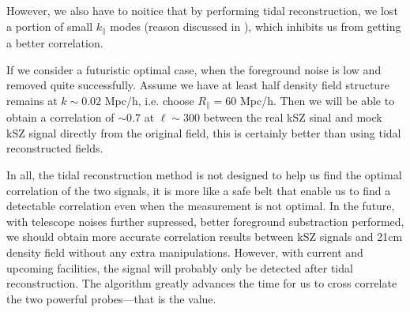 However, we also have to noitice that by performing tidal reconstruction, 
we lost a portion of small $k_\parallel$ modes (reason discussed in \cite{2015:zhu}), 
which inhibits us from getting a better correlation.

If we consider a futuristic optimal case, when the foreground noise is
low and removed quite successfully.
Assume we have at least half density field structure remains at $k\sim
0.02$ Mpc/h, i.e. choose $R_\parallel=60$ Mpc/h.
Then we will be able to obtain a correlation of $\sim0.7$ at
$\ell\sim 300$ between the real kSZ sinal and mock kSZ signal directly
from the original field, this is certainly better than using tidal
reconstructed fields.

In all, the tidal reconstruction method is not designed to help us find the optimal correlation of the two signals, 
it is more like a safe belt that enable us to find a detectable correlation even when the measurement is not optimal. 
In the future, with telescope noises further supressed, 
better foreground substraction performed,
we should obtain more accurate correlation results between kSZ
signals and 21cm density field without any extra manipulations.
However, with current and upcoming facilities, the signal will
probably only be detected after tidal reconstruction.
The algorithm greatly advances the time for us to cross correlate
the two powerful probes---that is the value.



